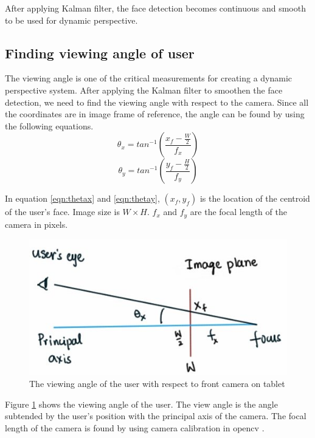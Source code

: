 \documentclass[12pt,twocolumn,letterpaper]{article}
\begin{document}
After applying Kalman filter, the face detection becomes continuous and smooth to be used for dynamic perspective.

\subsection{Finding viewing angle of user}
The viewing angle is one of the critical measurements for creating a dynamic perspective system. After applying the Kalman filter to smoothen the face detection, we need to find the viewing angle with respect to the camera. Since all the coordinates are in image frame of reference, the angle can be found by using the following equations. 
\begin{equation}
\theta_x = tan^{-1} \left( \frac{x_f - \frac{W}{2}}{f_x} \right)
\label{eqn:thetax}
\end{equation}
\begin{equation}
\theta_y = tan^{-1} \left( \frac{y_f - \frac{H}{2}}{f_y} \right)
\label{eqn:thetay}
\end{equation}

In equation \ref{eqn:thetax} and \ref{eqn:thetay}, $(x_f, y_f)$ is the location of the centroid of the user's face. Image size is $W \times H$. $f_x$ and $f_y$ are the focal length of the camera in pixels.

\begin{figure}
\includegraphics[scale=0.5]{images/view_angle}
\caption{The viewing angle of the user with respect to front camera on tablet}
\label{fig:viewangle}
\end{figure}

Figure \ref{fig:viewangle} shows the viewing angle of the user. The view angle is the angle subtended by the user's position with the principal axis of the camera. The focal length of the camera is found by using camera calibration in opencv \cite{calibration}.
\end{document}
